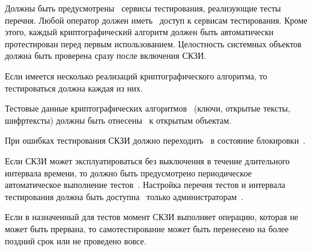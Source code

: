 Должны быть предусмотрены~ сервисы тестирования, реализующие 
тесты перечня. Любой оператор должен иметь~ доступ к 
сервисам тестирования.
%
Кроме этого, каждый криптографический алгоритм должен быть автоматически 
протестирован перед первым использованием.
%
Целостность системных объектов должна быть проверена сразу после включения 
СКЗИ.

\begin{note}
Если имеется несколько реализаций криптографического алгоритма, 
то тестироваться должна каждая из них.
\end{note}

\label{R.ST.TestData} %
Тестовые данные криптографических алгоритмов~ 
(ключи, открытые тексты, шифртексты) 
должны быть отнесены~ к открытым объектам.

\label{R.ST.TestLock} %
При ошибках тестирования СКЗИ должно переходить~ 
в состояние блокировки~.


\label{R.ST.Periodic} %
Если СКЗИ может эксплуатироваться без выключения в течение длительного интервала
времени, то должно быть предусмотрено периодическое автоматическое выполнение 
тестов~. Настройка перечня тестов и интервала тестирования
должна быть доступна~ только 
администраторам~.

\begin{note}
Если в назначенный для тестов момент СКЗИ выполняет операцию, которая не может 
быть прервана, то самотестирование может быть перенесено на более поздний срок
или не проведено вовсе.
%
\end{note} 

